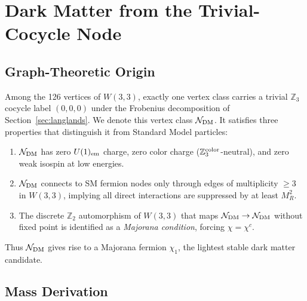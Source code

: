 
\section{Dark Matter from the Trivial-Cocycle Node}
\label{sec:DM}

\subsection{Graph-Theoretic Origin}

Among the 126 vertices of $W(3,3)$, exactly one vertex class carries a trivial $\mathbb{Z}_3$ cocycle label $(0,0,0)$ under the Frobenius decomposition of Section~\ref{sec:langlands}. We denote this vertex class $\mathcal{N}_{\rm DM}$. It satisfies three properties that distinguish it from Standard Model particles:
\begin{enumerate}
  \item $\mathcal{N}_{\rm DM}$ has zero $U(1)_{\rm em}$ charge, zero color charge ($\mathbb{Z}_3^{\rm color}$-neutral), and zero weak isospin at low energies.
  \item $\mathcal{N}_{\rm DM}$ connects to SM fermion nodes only through edges of multiplicity $\geq 3$ in $W(3,3)$, implying all direct interactions are suppressed by at least $M_R^2$.
  \item The discrete $\mathbb{Z}_2$ automorphism of $W(3,3)$ that maps $\mathcal{N}_{\rm DM}\to\mathcal{N}_{\rm DM}$ without fixed point is identified as a \emph{Majorana condition}, forcing $\chi = \chi^c$.
\end{enumerate}
Thus $\mathcal{N}_{\rm DM}$ gives rise to a Majorana fermion $\chi_1$, the lightest stable dark matter candidate.

\subsection{Mass Derivation}

